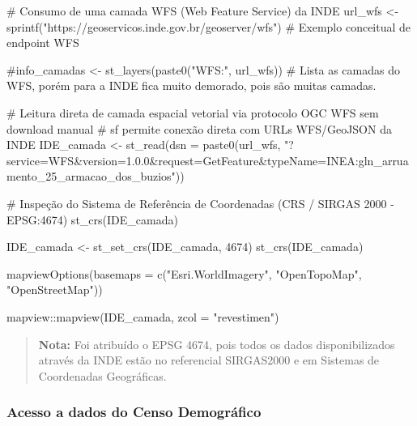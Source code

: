 \documentclass[
  letterpaper,
  DIV=11,
  numbers=noendperiod]{scrreprt}
\newenvironment{Shaded}{\begin{snugshade}}{\end{snugshade}}
\newcommand{\AttributeTok}[1]{\textcolor[rgb]{0.40,0.45,0.13}{#1}}
\newcommand{\CommentTok}[1]{\textcolor[rgb]{0.37,0.37,0.37}{#1}}
\newcommand{\DecValTok}[1]{\textcolor[rgb]{0.68,0.00,0.00}{#1}}
\newcommand{\FunctionTok}[1]{\textcolor[rgb]{0.28,0.35,0.67}{#1}}
\newcommand{\NormalTok}[1]{\textcolor[rgb]{0.00,0.23,0.31}{#1}}
\newcommand{\OtherTok}[1]{\textcolor[rgb]{0.00,0.23,0.31}{#1}}
\newcommand{\SpecialCharTok}[1]{\textcolor[rgb]{0.37,0.37,0.37}{#1}}
\newcommand{\StringTok}[1]{\textcolor[rgb]{0.13,0.47,0.30}{#1}}
\begin{document}
\begin{Shaded}
\begin{Highlighting}[]
\CommentTok{\# Consumo de uma camada WFS (Web Feature Service) da INDE}
\NormalTok{url\_wfs }\OtherTok{\textless{}{-}} \FunctionTok{sprintf}\NormalTok{(}\StringTok{"https://geoservicos.inde.gov.br/geoserver/wfs"}\NormalTok{) }\CommentTok{\# Exemplo conceitual de endpoint WFS}

\CommentTok{\#info\_camadas \textless{}{-} st\_layers(paste0("WFS:", url\_wfs)) \# Lista as camadas do WFS, porém para a INDE fica muito demorado, pois são muitas camadas. }

\CommentTok{\# Leitura direta de camada espacial vetorial via protocolo OGC WFS sem download manual}
\CommentTok{\# sf permite conexão direta com URLs WFS/GeoJSON da INDE}
\NormalTok{IDE\_camada }\OtherTok{\textless{}{-}} \FunctionTok{st\_read}\NormalTok{(}\AttributeTok{dsn =} \FunctionTok{paste0}\NormalTok{(url\_wfs, }\StringTok{"?service=WFS\&version=1.0.0\&request=GetFeature\&typeName=INEA:gln\_arruamento\_25\_armacao\_dos\_buzios"}\NormalTok{))}

\CommentTok{\# Inspeção do Sistema de Referência de Coordenadas (CRS / SIRGAS 2000 {-} EPSG:4674)}
\FunctionTok{st\_crs}\NormalTok{(IDE\_camada)}

\NormalTok{IDE\_camada }\OtherTok{\textless{}{-}} \FunctionTok{st\_set\_crs}\NormalTok{(IDE\_camada, }\DecValTok{4674}\NormalTok{)}
\FunctionTok{st\_crs}\NormalTok{(IDE\_camada)}

\FunctionTok{mapviewOptions}\NormalTok{(}\AttributeTok{basemaps =} \FunctionTok{c}\NormalTok{(}\StringTok{"Esri.WorldImagery"}\NormalTok{, }\StringTok{"OpenTopoMap"}\NormalTok{, }\StringTok{"OpenStreetMap"}\NormalTok{))}

\NormalTok{mapview}\SpecialCharTok{::}\FunctionTok{mapview}\NormalTok{(IDE\_camada, }\AttributeTok{zcol =} \StringTok{"revestimen"}\NormalTok{)}
\end{Highlighting}
\end{Shaded}

\begin{quote}
\textbf{Nota:} Foi atribuído o EPSG 4674, pois todos os dados
disponibilizados através da INDE estão no referencial SIRGAS2000 e em
Sistemas de Coordenadas Geográficas.
\end{quote}

\subsubsection{\texorpdfstring{\textbf{Acesso a dados do Censo
Demográfico}}{Acesso a dados do Censo Demográfico}}\label{acesso-a-dados-do-censo-demogruxe1fico}
\end{document}
